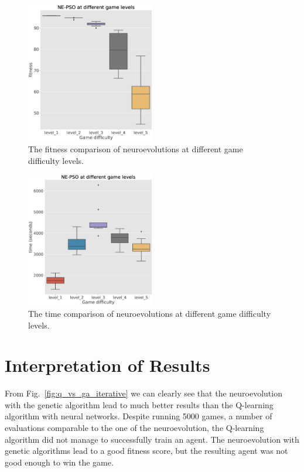 \documentclass[conference]{IEEEtran}
\begin{document}
\begin{figure}[!h]
    \centering
    \includegraphics[width=0.5\textwidth]{images/pso_levels.eps}
    \caption{The fitness comparison of neuroevolutions at different game difficulty levels.}
    \label{fig:pso_levels}
\end{figure}


\begin{figure}[!h]
    \centering
    \includegraphics[width=0.5\textwidth]{images/pso_levels_time.eps}
    \caption{The time comparison of neuroevolutions at different game difficulty levels.}
    \label{fig:pso_levels_time}
\end{figure}

\newpage

\section{Interpretation of Results}\label{sec:interpretation-of-results}

From Fig.~\ref{fig:q_vs_ga_iterative} we can clearly see that the neuroevolution with the genetic algorithm
lead to much better results than the Q-learning algorithm with neural networks.
Despite running 5000 games, a number of evaluations comparable to the one of the neuroevolution,
the Q-learning algorithm did not manage to successfully train an agent.
The neuroevolution with genetic algorithms lead to a good fitness score, but the resulting agent was not good enough
to win the game.
\end{document}
